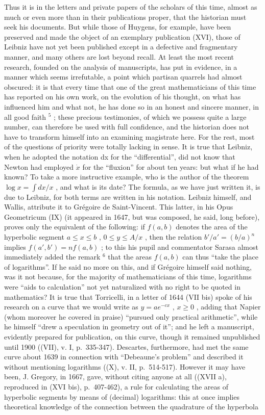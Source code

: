 Thus it is in the letters and private papers of the scholars of this time, almost as much or even more than in their publications proper, that the historian must seek his documents. But while those of Huygens, for example, have been preserved and made the object of an exemplary publication (XVI), those of Leibniz have not yet been published except in a defective and fragmentary manner, and many others are lost beyond recall. At least the most recent research, founded on the analysis of manuscripts, has put in evidence, in a manner which seems irrefutable, a point which partisan quarrels had almost obscured: it is that every time that one of the great mathematicians of this time has reported on his own work, on the evolution of his thought, on what has influenced him and what not, he has done so in an honest and sincere manner, in all good faith \(^{5}\) ; these precious testimonies, of which we possess quite a large number, can therefore be used with full confidence, and the historian does not have to transform himself into an examining magistrate here. For the rest, most of the questions of priority were totally lacking in sense. It is true that Leibniz, when he adopted the notation dx for the ``differential'', did not know that Newton had employed \(\dot{x}\) for the ``fluxion'' for about ten years: but what if he had known? To take a more instructive example, who is the author of the theorem \(\log x = \int dx/x\) , and what is its date? The formula, as we have just written it, is due to Leibniz, for both terms are written in his notation. Leibniz himself, and Wallis, attribute it to Grégoire de Saint-Vincent. This latter, in his Opus Geometricum (IX) (it appeared in 1647, but was composed, he said, long before), proves only the equivalent of the following: if \(f(a, b)\) denotes the area of the hyperbolic segment \(a \leqslant x \leqslant b\) , \(0 \leqslant y \leqslant A/x\) , then the relation \(b'/a' = (b/a)^n\) implies \(f(a', b') = n f(a, b)\) ; to this his pupil and commentator Sarasa almost immediately added the remark \(^{6}\) that the areas \(f(a, b)\) can thus ``take the place of logarithms''. If he said no more on this, and if Grégoire himself said nothing, was it not because, for the majority of mathematicians of this time, logarithms were ``aids to calculation'' not yet naturalized with no right to be quoted in mathematics? It is true that Torricelli, in a letter of 1644 (VII bis) spoke of his research on a curve that we would write as \(y = ae^{-cx}\) , \(x \geqslant 0\) , adding that Napier (whom moreover he covered in praise) ``pursued only practical arithmetic'', while he himself ``drew a speculation in geometry out of it''; and he left a manuscript, evidently prepared for publication, on this curve, though it remained unpublished until 1900 ((VII), v. I, p.~335-347). Descartes, furthermore, had met the same curve about 1639 in connection with ``Debeaune's problem'' and described it without mentioning logarithms ((X), v. II, p.~514-517). However it may have been, J. Gregory, in 1667, gave, without citing anyone at all ((XVII a), reproduced in (XVI bis), p.~407-462), a rule for calculating the areas of hyperbolic segments by means of (decimal) logarithms: this at once implies theoretical knowledge of the connection between the quadrature of the hyperbola 